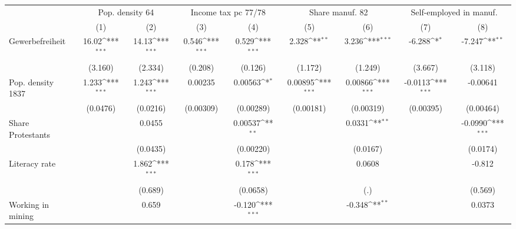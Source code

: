 {
\def\sym#1{\ifmmode^{#1}\else\(^{#1}\)\fi}
\begin{tabular}{l*{8}{c}}
\hline\hline
                &\multicolumn{2}{c}{Pop. density 64}  &\multicolumn{2}{c}{Income tax pc 77/78}&\multicolumn{2}{c}{Share manuf. 82}  &\multicolumn{2}{c}{Self-employed in manuf.}\\\cmidrule(lr){2-3}\cmidrule(lr){4-5}\cmidrule(lr){6-7}\cmidrule(lr){8-9}
                &\multicolumn{1}{c}{(1)}         &\multicolumn{1}{c}{(2)}         &\multicolumn{1}{c}{(3)}         &\multicolumn{1}{c}{(4)}         &\multicolumn{1}{c}{(5)}         &\multicolumn{1}{c}{(6)}         &\multicolumn{1}{c}{(7)}         &\multicolumn{1}{c}{(8)}         \\
\hline
Gewerbefreiheit &    16.02\sym{***}&    14.13\sym{***}&    0.546\sym{***}&    0.529\sym{***}&    2.328\sym{**} &    3.236\sym{***}&   -6.288\sym{*}  &   -7.247\sym{**} \\
                &  (3.160)         &  (2.334)         &  (0.208)         &  (0.126)         &  (1.172)         &  (1.249)         &  (3.667)         &  (3.118)         \\
[1em]
Pop. density 1837&    1.233\sym{***}&    1.243\sym{***}&  0.00235         &  0.00563\sym{*}  &  0.00895\sym{***}&  0.00866\sym{***}&  -0.0113\sym{***}& -0.00641         \\
                & (0.0476)         & (0.0216)         &(0.00309)         &(0.00289)         &(0.00181)         &(0.00319)         &(0.00395)         &(0.00464)         \\
[1em]
Share Protestants&                  &   0.0455         &                  &  0.00537\sym{**} &                  &   0.0331\sym{**} &                  &  -0.0990\sym{***}\\
                &                  & (0.0435)         &                  &(0.00220)         &                  & (0.0167)         &                  & (0.0174)         \\
[1em]
Literacy rate   &                  &    1.862\sym{***}&                  &    0.178\sym{***}&                  &   0.0608         &                  &   -0.812         \\
                &                  &  (0.689)         &                  & (0.0658)         &                  &      (.)         &                  &  (0.569)         \\
[1em]
Working in mining&                  &    0.659         &                  &   -0.120\sym{***}&                  &   -0.348\sym{**} &                  &   0.0373         \\

\end{tabular}}
